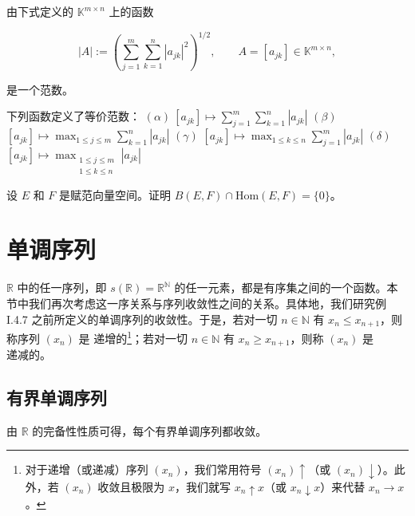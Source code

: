 \begin{exercises}
\begin{items}
\item

由下式定义的 $ \mathbb{K}^{m\times n} $ 上的函数

\[
|A|:=\left(\sum_{j=1}^{m}\sum_{k=1}^{n}\left|a_{j k}\right|^{2}\right)^{1/2},\qquad A=[a_{j k}]\in\mathbb{K}^{m\times n},
\]

是一个范数。

\item

下列函数定义了等价范数：
 $ (\alpha)\ [a_{jk}] \mapsto \sum_{j=1}^{m} \sum_{k=1}^{n} |a_{jk}| $
 $ (\beta) $  $ [a_{jk}] \mapsto \max_{1 \leq j \leq m} \sum_{k=1}^{n} |a_{jk}| $
 $ (\gamma) $  $ [a_{jk}] \mapsto \max_{1 \leq k \leq n} \sum_{j=1}^{m} |a_{jk}| $
 $ (\delta) $  $ [a_{jk}] \mapsto \max_{\substack{1 \leq j \leq m\\ 1 \leq k \leq n}} |a_{jk}| $

\end{items}

\item[15.]

设 $E$ 和 $F$ 是赋范向量空间。证明 $B(E, F) \cap \mathrm{Hom}(E, F) = \{0\}$。

\end{exercises}

\section{单调序列}

$\mathbb{R}$ 中的任一序列，即 $s(\mathbb{R}) = \mathbb{R}^{\mathbb{N}}$ 的任一元素，都是有序集之间的一个函数。本节中我们再次考虑这一序关系与序列收敛性之间的关系。具体地，我们研究例 I.4.7 之前所定义的单调序列的收敛性。于是，若对一切 $n \in \mathbb{N}$ 有 $x_n \leq x_{n+1}$，则称序列 $(x_n)$ 是 $\text{递增的}$\footnote{对于递增（或递减）序列 $(x_{n})$，我们常用符号 $(x_{n})\uparrow$（或 $(x_{n})\downarrow$）。此外，若 $(x_{n})$ 收敛且极限为 $x$，我们就写 $x_{n}\uparrow x$（或 $x_{n}\downarrow x$）来代替 $x_{n}\to x$。}；若对一切 $n \in \mathbb{N}$ 有 $x_n \geq x_{n+1}$，则称 $(x_n)$ 是 $\text{递减的}$。

\subsection*{有界单调序列}

由  $ \mathbb{R} $ 的完备性性质可得，每个有界单调序列都收敛。

